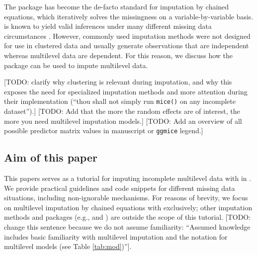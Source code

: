 \documentclass[
]{jss}
\begin{document}
The  package  has become the de-facto standard for
imputation by chained equations, which iteratively solves the
missingness on a variable-by-variable basis.  is known to
yield valid inferences under many different missing data circumstances
\citep{buur18}. However, commonly used imputation methods were not
designed for use in clustered data and usually generate observations
that are independent whereas multilevel data are dependent. For this
reason, we discuss how the  package  can be used
to impute multilevel data.

{[}TODO: clarify why clustering is relevant during imputation, and why
this exposes the need for specialized imputation methods and more
attention during their implementation (``thou shall not simply run
\texttt{mice()} on any incomplete dataset'').{]} {[}TODO: Add that the
more the random effects are of interest, the more you need multilevel
imputation models.{]} {[}TODO: Add an overview of all possible predictor
matrix values in manuscript or \texttt{ggmice} legend.{]}

\hypertarget{aim-of-this-paper}{%
\subsection{Aim of this paper}\label{aim-of-this-paper}}

This papers serves as a tutorial for imputing incomplete multilevel data
with  in . We provide practical guidelines and
code snippets for different missing data situations, including
non-ignorable mechanisms. For reasons of brevity, we focus on multilevel
imputation by chained equations with  exclusively; other
imputation methods and packages (e.g.,  and ) are
outside the scope of this tutorial. {[}TODO: change this sentence
because we do not assume familiarity: ``Assumed knowledge includes basic
familiarity with multilevel imputation \citep[see e.g.][ and
\citet{grun18}]{audi18} and the  notation for multilevel
models (see Table \ref{tab:mod})''{]}.
\end{document}
